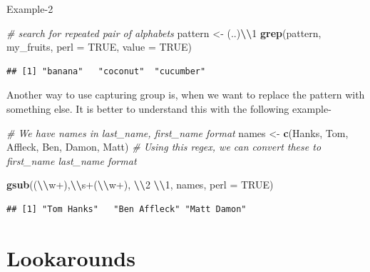 \documentclass[
]{book}
\newenvironment{Shaded}{\begin{snugshade}}{\end{snugshade}}
\newcommand{\AttributeTok}[1]{\textcolor[rgb]{0.13,0.29,0.53}{#1}}
\newcommand{\CommentTok}[1]{\textcolor[rgb]{0.56,0.35,0.01}{\textit{#1}}}
\newcommand{\ConstantTok}[1]{\textcolor[rgb]{0.56,0.35,0.01}{#1}}
\newcommand{\FunctionTok}[1]{\textcolor[rgb]{0.13,0.29,0.53}{\textbf{#1}}}
\newcommand{\NormalTok}[1]{#1}
\newcommand{\OtherTok}[1]{\textcolor[rgb]{0.56,0.35,0.01}{#1}}
\newcommand{\SpecialCharTok}[1]{\textcolor[rgb]{0.81,0.36,0.00}{\textbf{#1}}}
\newcommand{\StringTok}[1]{\textcolor[rgb]{0.31,0.60,0.02}{#1}}
\begin{document}
Example-2

\begin{Shaded}
\begin{Highlighting}[]
\CommentTok{\# search for repeated pair of alphabets}
\NormalTok{pattern }\OtherTok{\textless{}{-}} \StringTok{\textquotesingle{}(..)}\SpecialCharTok{\textbackslash{}\textbackslash{}}\StringTok{1\textquotesingle{}}
\FunctionTok{grep}\NormalTok{(pattern, my\_fruits, }\AttributeTok{perl =} \ConstantTok{TRUE}\NormalTok{, }\AttributeTok{value =} \ConstantTok{TRUE}\NormalTok{)}
\end{Highlighting}
\end{Shaded}

\begin{verbatim}
## [1] "banana"   "coconut"  "cucumber"
\end{verbatim}

Another way to use capturing group is, when we want to replace the pattern with something else. It is better to understand this with the following example-

\begin{Shaded}
\begin{Highlighting}[]
\CommentTok{\# We have names in last\_name, first\_name format}
\NormalTok{names }\OtherTok{\textless{}{-}} \FunctionTok{c}\NormalTok{(}\StringTok{\textquotesingle{}Hanks, Tom\textquotesingle{}}\NormalTok{, }\StringTok{\textquotesingle{}Affleck, Ben\textquotesingle{}}\NormalTok{, }\StringTok{\textquotesingle{}Damon, Matt\textquotesingle{}}\NormalTok{)}
\CommentTok{\# Using this regex, we can convert these to first\_name last\_name format}

\FunctionTok{gsub}\NormalTok{(}\StringTok{\textquotesingle{}(}\SpecialCharTok{\textbackslash{}\textbackslash{}}\StringTok{w+),}\SpecialCharTok{\textbackslash{}\textbackslash{}}\StringTok{s+(}\SpecialCharTok{\textbackslash{}\textbackslash{}}\StringTok{w+)\textquotesingle{}}\NormalTok{, }\StringTok{\textquotesingle{}}\SpecialCharTok{\textbackslash{}\textbackslash{}}\StringTok{2 }\SpecialCharTok{\textbackslash{}\textbackslash{}}\StringTok{1\textquotesingle{}}\NormalTok{, names, }\AttributeTok{perl =} \ConstantTok{TRUE}\NormalTok{)}
\end{Highlighting}
\end{Shaded}

\begin{verbatim}
## [1] "Tom Hanks"   "Ben Affleck" "Matt Damon"
\end{verbatim}

\hypertarget{lookarounds}{%
\section{Lookarounds}\label{lookarounds}}
\end{document}
